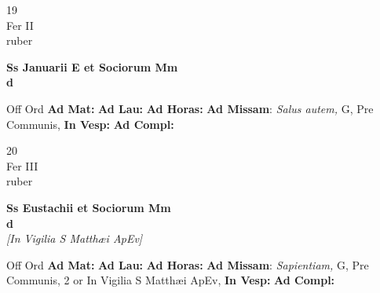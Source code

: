 \documentclass[10pt, openany]{book}
\begin{document}
        \begin{center}
            \begin{minipage}{3.5in}
                \vspace{2em}
                \begin{minipage}{0.5in}
                    {\Huge 19} \\
                    {\normalsize Fer II} \\
                    {\normalsize ruber}
                \end{minipage}
                \begin{minipage}{3.0in}
                    \textbf{ \large Ss Januarii E et Sociorum Mm \\
                    \textnormal{\normalsize d}} \\ 
                \end{minipage}
                \begin{justify}Off Ord
                    \textbf{Ad Mat: }
                    \textbf{Ad Lau: }
                    \textbf{Ad Horas: }\textbf{Ad Missam}: \textit{Salus autem,} G, Pre Communis,  
                    \textbf{In Vesp: }
                    \textbf{Ad Compl: }
                \end{justify}
            \end{minipage}
        \end{center}
    
        \begin{center}
            \begin{minipage}{3.5in}
                \vspace{2em}
                \begin{minipage}{0.5in}
                    {\Huge 20} \\
                    {\normalsize Fer III} \\
                    {\normalsize ruber}
                \end{minipage}
                \begin{minipage}{3.0in}
                    \textbf{ \large Ss Eustachii et Sociorum Mm \\
                    \textnormal{\normalsize d}} \\ \textit{[In Vigilia S Matthæi ApEv]} \\ 
                \end{minipage}
                \begin{justify}Off Ord
                    \textbf{Ad Mat: }
                    \textbf{Ad Lau: }
                    \textbf{Ad Horas: }\textbf{Ad Missam}: \textit{Sapientiam,} G, Pre Communis, 2 or In Vigilia S Matthæi ApEv,  
                    \textbf{In Vesp: }
                    \textbf{Ad Compl: }
                \end{justify}
            \end{minipage}
        \end{center}
    
\end{document}
